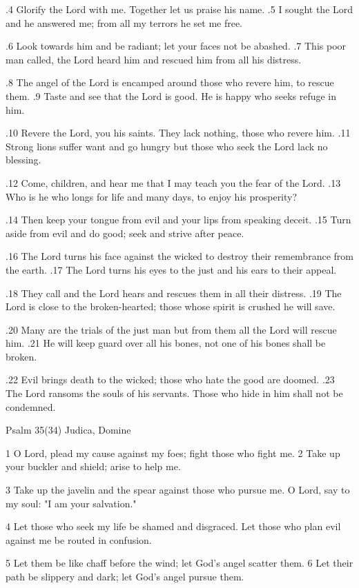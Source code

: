 .4 Glorify the Lord with me.
Together let us praise his name.
.5 I sought the Lord and he answered me;
from all my terrors he set me free.

.6 Look towards him and be radiant;
let your faces not be abashed.
.7 This poor man called, the Lord heard him
and rescued him from all his distress.

.8 The angel of the Lord is encamped
around those who revere him, to rescue them.
.9 Taste and see that the Lord is good.
He is happy who seeks refuge in him.

.10 Revere the Lord, you his saints.
They lack nothing, those who revere him.
.11 Strong lions suffer want and go hungry
but those who seek the Lord lack no blessing.

.12 Come, children, and hear me
that I may teach you the fear of the Lord.
.13 Who is he who longs for life
and many days, to enjoy his prosperity?

.14 Then keep your tongue from evil
and your lips from speaking deceit.
.15 Turn aside from evil and do good;
seek and strive after peace.

.16 The Lord turns his face against the wicked
to destroy their remembrance from the earth.
.17 The Lord turns his eyes to the just
and his ears to their appeal.

.18 They call and the Lord hears
and rescues them in all their distress.
.19 The Lord is close to the broken-hearted;
those whose spirit is crushed he will save.

.20 Many are the trials of the just man
but from them all the Lord will rescue him.
.21 He will keep guard over all his bones,
not one of his bones shall be broken.

.22 Evil brings death to the wicked;
those who hate the good are doomed.
.23 The Lord ransoms the souls of his servants.
Those who hide in him shall not be condemned.


Psalm 35(34) Judica, Domine

1 O Lord, plead my cause against my foes;
fight those who fight me.
2 Take up your buckler and shield;
arise to help me.

3 Take up the javelin and the spear
against those who pursue me.
O Lord, say to my soul:
"I am your salvation."

4 Let those who seek my life
be shamed and disgraced.
Let those who plan evil against me
be routed in confusion.

5 Let them be like chaff before the wind;
let God's angel scatter them.
6 Let their path be slippery and dark;
let God's angel pursue them.

